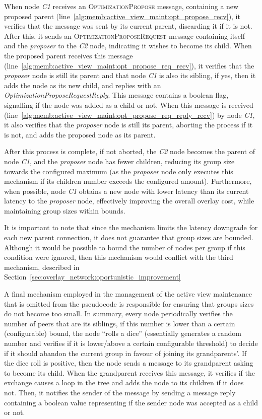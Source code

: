 When node \textit{C1} receives an \textsc{OptimizationPropose} message, containing a new proposed parent (line~\ref{alg:memb:active_view_maint:opt_propose_recv}), it verifies that the message was sent by its current parent, discarding it if it is not. After this, it sends an \textsc{OptimizationProposeRequest} message containing itself and the \textit{proposer} to the \textit{C2} node, indicating it wishes to become its child. When the proposed parent receives this message (line~\ref{alg:memb:active_view_maint:opt_propose_req_recv}), it verifies that the \textit{proposer} node is still its parent and that node \textit{C1} is also its sibling, if yes, then it adds the node as its new child, and replies with an \textit{OptimizationProposeRequestReply}. This message contains a boolean flag, signalling if the node was added as a child or not. When this message is received (line~\ref{alg:memb:active_view_maint:opt_propose_req_reply_recv}) by node \textit{C1}, it also verifies that the \textit{proposer} node is still its parent, aborting the process if it is not, and adds the proposed node as its parent.

After this process is complete, if not aborted, the \textit{C2} node becomes the parent of node \textit{C1}, and the \textit{proposer} node has fewer children, reducing its group size towards the configured maximum (as the \textit{proposer} node only executes this mechanism if its children number exceeds the configured amount). Furthermore, when possible, node \textit{C1} obtains a new node with lower latency than its current latency to the \textit{proposer} node, effectively improving the overall overlay cost, while maintaining group sizes within bounds.

It is important to note that since the mechanism limits the latency downgrade for each new parent connection, it does not guarantee that group sizes are bounded. Although it would be possible to bound the number of nodes per group if this condition were ignored, then this mechanism would conflict with the third mechanism, described in Section~\ref{sec:overlay_network:oportunistic_improvement}

A final mechanism employed in the management of the active view maintenance that is omitted from the pseudocode is responsible for ensuring that groups sizes do not become too small. In summary, every node periodically verifies the number of peers that are its siblings, if this number is lower than a certain (configurable) bound, the node ``rolls a dice'' (essentially generates a random number and verifies if it is lower/above a certain configurable threshold) to decide if it should abandon the current group in favour of joining its grandparents'. If the dice roll is positive, then the node sends a message to its grandparent asking to become its child. When the grandparent receives this message, it verifies if the exchange causes a loop in the tree and adds the node to its children if it does not. Then, it notifies the sender of the message by sending a message reply containing a boolean value representing if the sender node was accepted as a child or not. 

